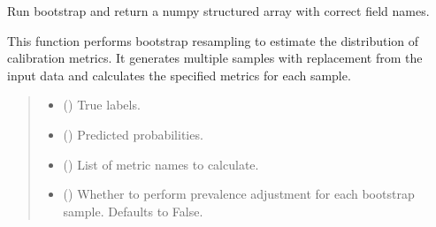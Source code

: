 \documentclass[letterpaper,10pt,english]{sphinxmanual}
\begin{document}
\begin{fulllineitems}
\begin{fulllineitems}
\end{fulllineitems}


\begin{fulllineitems}
\label{\detokenize{calzone:calzone.metrics.CalibrationMetrics.bootstrap}}
\pysigstartsignatures
{}
\pysigstopsignatures
\sphinxAtStartPar
Run bootstrap and return a numpy structured array with correct field names.

\sphinxAtStartPar
This function performs bootstrap resampling to estimate the distribution of calibration metrics.
It generates multiple samples with replacement from the input data and calculates the specified
metrics for each sample.
\begin{quote}\begin{description}
\begin{itemize}
\item {} 
\sphinxAtStartPar
{} () \textendash{} True labels.

\item {} 
\sphinxAtStartPar
{} () \textendash{} Predicted probabilities.

\item {} 
\sphinxAtStartPar
{} () \textendash{} List of metric names to calculate.

\item {} 
\sphinxAtStartPar
{} (\sphinxstyleliteralemphasis{\sphinxupquote{, }}) \textendash{} Whether to perform prevalence adjustment for each bootstrap sample. Defaults to False.


\end{itemize}
\end{description}
\end{quote}
\end{fulllineitems}
\end{fulllineitems}
\end{document}
